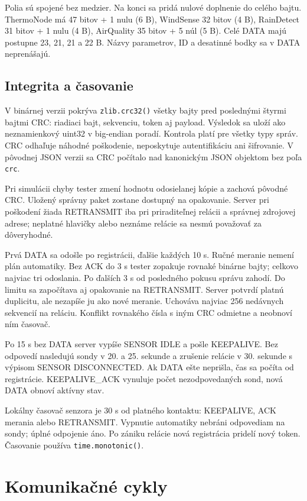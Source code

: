 \documentclass[12pt,a4paper]{article}
\begin{document}
Polia sú spojené bez medzier. Na konci sa pridá nulové doplnenie do celého bajtu. ThermoNode má 47 bitov + 1 nulu (6 B), WindSense 32 bitov (4 B), RainDetect 31 bitov + 1 nulu (4 B), AirQuality 35 bitov + 5 núl (5 B). Celé DATA majú postupne 23, 21, 21 a 22 B. Názvy parametrov, ID a desatinné bodky sa v DATA neprenášajú.

\subsection{Integrita a časovanie}

V binárnej verzii pokrýva \texttt{zlib.crc32()} všetky bajty pred poslednými štyrmi bajtmi CRC: riadiaci bajt, sekvenciu, token aj payload. Výsledok sa uloží ako neznamienkový uint32 v big-endian poradí. Kontrola platí pre všetky typy správ. CRC odhaľuje náhodné poškodenie, neposkytuje autentifikáciu ani šifrovanie. V pôvodnej JSON verzii sa CRC počítalo nad kanonickým JSON objektom bez poľa \texttt{crc}.

Pri simulácii chyby tester zmení hodnotu odosielanej kópie a zachová pôvodné CRC. Uložený správny paket zostane dostupný na opakovanie. Server pri poškodení žiada RETRANSMIT iba pri priraditeľnej relácii a správnej zdrojovej adrese; neplatné hlavičky alebo neznáme relácie sa nesmú považovať za dôveryhodné.

Prvá DATA sa odošle po registrácii, ďalšie každých 10 s. Ručné meranie nemení plán automatiky. Bez ACK do 3 s tester zopakuje rovnaké binárne bajty; celkovo najviac tri odoslania. Po ďalších 3 s od posledného pokusu správu zahodí. Do limitu sa započítava aj opakovanie na RETRANSMIT. Server potvrdí platnú duplicitu, ale nezapíše ju ako nové meranie. Uchováva najviac 256 nedávnych sekvencií na reláciu. Konflikt rovnakého čísla s iným CRC odmietne a neobnoví ním časovač.

Po 15 s bez DATA server vypíše SENSOR IDLE a pošle KEEPALIVE. Bez odpovedí nasledujú sondy v 20. a 25. sekunde a zrušenie relácie v 30. sekunde s výpisom SENSOR DISCONNECTED. Ak DATA ešte neprišla, čas sa počíta od registrácie. KEEPALIVE\_ACK vynuluje počet nezodpovedaných sond, nová DATA obnoví aktívny stav.

Lokálny časovač senzora je 30 s od platného kontaktu: KEEPALIVE, ACK merania alebo RETRANSMIT. Vypnutie automatiky nebráni odpovediam na sondy; úplné odpojenie áno. Po zániku relácie nová registrácia pridelí nový token. Časovanie používa \texttt{time.monotonic()}.

\clearpage
\section{Komunikačné cykly}
\end{document}
